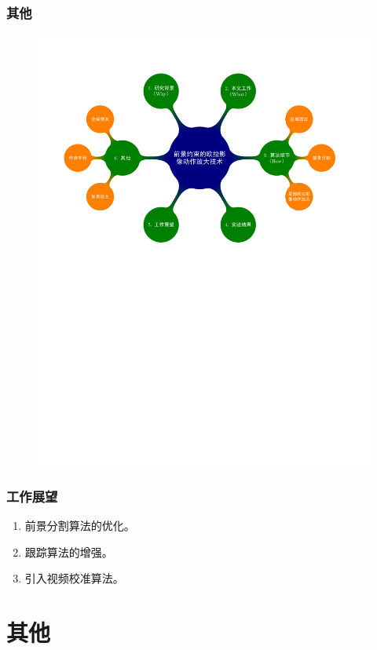 \documentclass[xcolor=svgnames,serif,table]{beamer}
\begin{document}
\begin{frame}
  \frametitle{其他}
  \vspace{-2.5em}
  \begin{figure}
    \centering
    \includegraphics[width=\textwidth, page=9]{mindmap.pdf}
  \end{figure}
\end{frame}

\begin{frame}
  \frametitle{工作展望}
  \begin{enumerate}[<+->]
  \item 前景分割算法的优化。
  \item 跟踪算法的增强。
  \item 引入视频校准算法。
  \end{enumerate}
\end{frame}

\section{其他}
\end{document}
